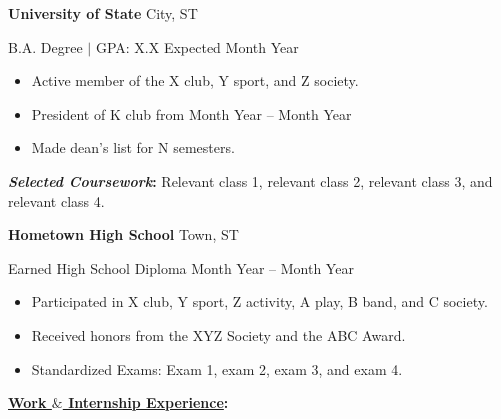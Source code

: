 \documentclass[11pt]{article}
\begin{document}
    \textbf{University of State} \hfill City, ST

    B.A. Degree $\mid$ GPA: X.X \hfill Expected Month Year

    \begin{itemize}[noitemsep,nolistsep]
        \item Active member of the X club, Y sport, and Z society.
    
        \item President of K club from Month Year – Month Year
    
        \item Made dean's list for N semesters.
    \end{itemize}

    \textbf{\textit{Selected Coursework}:} Relevant class 1, relevant class 2, relevant class 3, and relevant class 4.
    \vspace{1mm}

    \textbf{Hometown High School} \hfill Town, ST

    Earned High School Diploma \hfill Month Year – Month Year

    \begin{itemize}[noitemsep,nolistsep]
        \item Participated in X club, Y sport, Z activity, A play, B band, and C society.
    
        \item Received honors from the XYZ Society and the ABC Award.
    
        \item Standardized Exams: Exam 1, exam 2, exam 3, and exam 4.
    \end{itemize}

    \vspace{2mm}
\noindent\begin{Large}\textbf{\underline{Work $\textbf{\&}$ Internship Experience}:} \end{Large}
\vspace{1mm}
\end{document}
